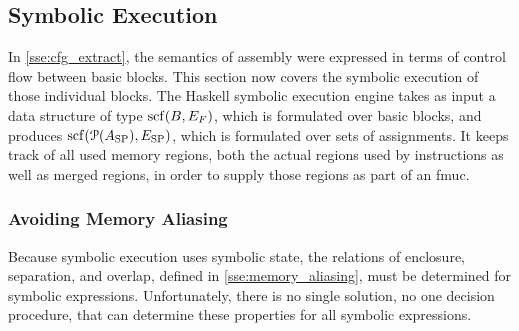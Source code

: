 \begin{comment}
  The next step considers the soundness of \textsc{stmts},%
  \index{soundness}
  which is largely straightforward.
  In the trivial case where $b=b_j$, both semantics are~$[]$, the empty path.%
  \index{semantics}
  That is,
  \begin{equation}
    \takeuntil(\sem_\mathrm{CFG}(b),b)=\sem_\mathrm{SCF}(\textsc{stmts}(b,b,f))=
    \sem_\mathrm{SCF}(\ASkip)=\{[]\}.
  \end{equation}
  The case for loops is more intricate.%
  \index{loop}
  The semantics of a loop with entry point~$b_e$%
  \index{loop!entry}
  is defined as the set of paths from~$b_e$ that can be split into three subpaths.
  The first subpath consists of the loop iterations,
  a list of any number of paths from~$b_e$ to~$b_e$.
  The second subpath is a path from~$b_e$ to an exit.
  The third subpath is a \emph{resume}, a path from an exit to the joint~$b_j$.%
  \index{joint}
  The algorithm produces a loop only if~$b_e$ is in a non-trivial \ac{scc}.
  Under that condition, the set of paths between~$b_e$ and the joint
  is exactly equal to the semantics of a loop.
\end{proof}
\end{comment}


\subsection{Symbolic Execution}\label{sse:syntax_symb}
In \cref{sse:cfg_extract}, the semantics of assembly were expressed
in terms of control flow between basic blocks.
This section now covers the symbolic execution of those individual blocks.
The Haskell symbolic execution engine
takes as input a data structure of type $\operatorname{scf}(B,E_F)$,
which is formulated over basic blocks,
and produces $\operatorname{scf}(\operatorname{\mathcal{P}}(A_\mathrm{SP}),E_\mathrm{SP})$,%
which is formulated over sets of assignments.
It keeps track of all used memory regions,
both the actual regions used by instructions as well as merged regions,
in order to supply those regions as part of an \ac{fmuc}.

\subsubsection{Avoiding Memory Aliasing}
Because symbolic execution uses symbolic state,
the relations of enclosure, separation, and overlap,
defined in \cref{sse:memory_aliasing}, must be determined for symbolic expressions.
Unfortunately, there is no single solution, no one decision procedure,
that can determine these properties for all symbolic expressions.

